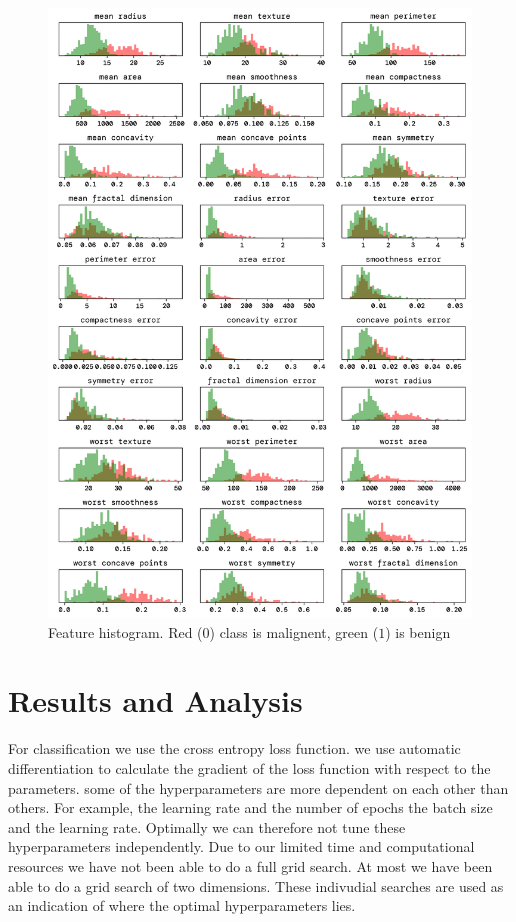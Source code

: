 \documentclass[twoside,11pt]{report}
\begin{document}
    \begin{figure}
        \begin{center}
            \includegraphics[width=\textwidth]{../runsAndFigures/feature_histogram.png}
        \end{center}
        \caption{Feature histogram. Red ($0$) class is malignent, green ($1$) is benign}\label{fig:feature_histogram}
    \end{figure}





\clearpage

\section{Results and Analysis}
\label{sec:resultsdiscussion}

    For classification we use the cross entropy loss function. 
    we use automatic differentiation to calculate the gradient of the loss function with respect to the parameters.
    some of the hyperparameters are more dependent on each other than others. For example, the learning 
    rate and the number of epochs
    the batch size and the learning rate. Optimally we can therefore not tune these hyperparameters independently.
    Due to our limited time and computational resources we have not been able to do a full grid search.
    At most we have been able to do a grid search of two dimensions.
    These indivudial searches are used as an indication of where the optimal hyperparameters lies.
\end{document}
